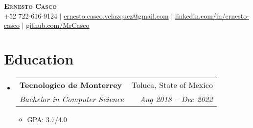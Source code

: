 \documentclass[letterpaper,11pt]{article}
\makeatletter
\newcommand{\resumeItem}[1]{
  \item\small{
    {#1 \vspace{-2pt}}
  }
}
\newcommand{\resumeSubheading}[4]{
  \vspace{-2pt}\item
    \begin{tabular*}{0.97\textwidth}[t]{l@{\extracolsep{\fill}}r}
      \textbf{#1} & #2 \\
      \textit{\small#3} & \textit{\small #4} \\
    \end{tabular*}\vspace{-7pt}
}
\newcommand{\resumeSubHeadingListStart}{\begin{itemize}[leftmargin=0.15in, label={}]}
\newcommand{\resumeSubHeadingListEnd}{\end{itemize}}
\newcommand{\resumeItemListStart}{\begin{itemize}}
\newcommand{\resumeItemListEnd}{\end{itemize}\vspace{-5pt}}
\makeatother
\begin{document}
\begin{center}
    \textbf{\Huge \scshape Ernesto Casco} \\ \vspace{1pt}
    \small +52 722-616-9124 $|$ \href{mailto:ernesto.casco.velazquez@gmail.com}{\underline{ernesto.casco.velazquez@gmail.com}} $|$ 
    \href{https://linkedin.com/in/ernesto-casco}{\underline{linkedin.com/in/ernesto-casco}} $|$
    \href{https://github.com/MrCasco}{\underline{github.com/MrCasco}}
\end{center}

\section{Education}
  \resumeSubHeadingListStart
    \resumeSubheading
      {Tecnologico de Monterrey}{Toluca, State of Mexico}
      {Bachelor in Computer Science}{Aug 2018 -- Dec 2022}
    \resumeItemListStart
        \resumeItem{GPA: 3.7/4.0}
      \resumeItemListEnd
  \resumeSubHeadingListEnd

\end{document}
